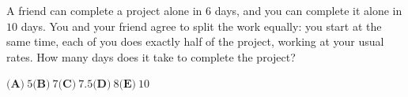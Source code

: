 A friend can complete a project alone in $6$ days, and you can complete it alone in $10$ days. You and your friend agree to split the work equally: you start at the same time, each of you does exactly half of the project, working at your usual rates. How many days does it take to complete the project?

$\textbf{(A)}\ 5$\qquad$\textbf{(B)}\ 7$\qquad$\textbf{(C)}\ 7.5$\qquad$\textbf{(D)}\ 8$\qquad$\textbf{(E)}\ 10$
